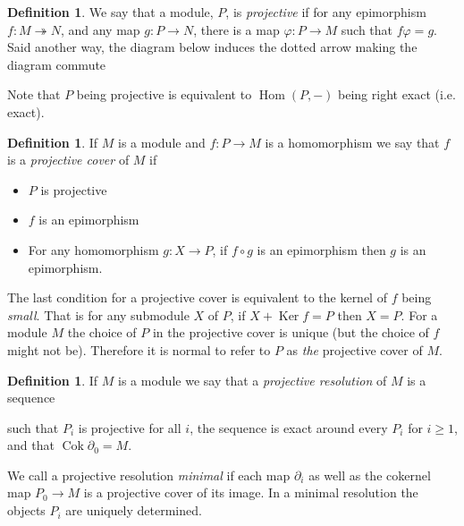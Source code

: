 \documentclass[11pt, a4paper, english]{article}
\theoremstyle{definition}
\newtheorem{defin}[theorem]{Definition}
\DeclareMathOperator{\Hom}{Hom}
\DeclareMathOperator{\Ker}{Ker}
\DeclareMathOperator{\Cok}{Cok}
\begin{document}
\begin{appendices}
\begin{defin}
\label{def:projective}
We say that a module, $P$, is \textit{projective} if for any epimorphism $f: M \twoheadrightarrow N$, and any map $g: P \to N$, there is a map $\varphi: P \to M$ such that $f \varphi = g$. Said another way, the diagram below induces the dotted arrow making the diagram commute
\begin{center}
\end{center}
Note that $P$ being projective is equivalent to $\Hom(P, -)$ being right exact (i.e. exact).
\end{defin}

\begin{defin}
\label{def:projective_cover}
If $M$ is a module and $f: P \to M$ is a homomorphism we say that $f$ is a \textit{projective cover} of $M$ if
\begin{itemize}
\item $P$ is projective
\item $f$ is an epimorphism
\item For any homomorphism $g: X \to P$, if $f \circ g$ is an epimorphism then $g$ is an epimorphism.
\end{itemize}
\end{defin}
The last condition for a projective cover is equivalent to the kernel of $f$ being \textit{small}. That is for any submodule $X$ of $P$, if $X + \Ker f = P$ then $X=P$. For a module $M$ the choice of $P$ in the projective cover is unique (but the choice of $f$ might not be). Therefore it is normal to refer to $P$ as \textit{the} projective cover of $M$.

\begin{defin}
\label{def:projective_resolution}
If $M$ is a module we say that a \textit{projective resolution} of $M$ is a sequence
\begin{center}
\end{center}
such that $P_i$ is projective for all $i$, the sequence is exact around every $P_i$ for $i \geq 1$, and that $\Cok \partial_0 = M$.

We call a projective resolution \textit{minimal} if each map $\partial_i$ as well as the cokernel map $P_0 \to M$ is a projective cover of its image. In a minimal resolution the objects $P_i$ are uniquely determined.
\end{defin}


\end{appendices}
\end{document}
